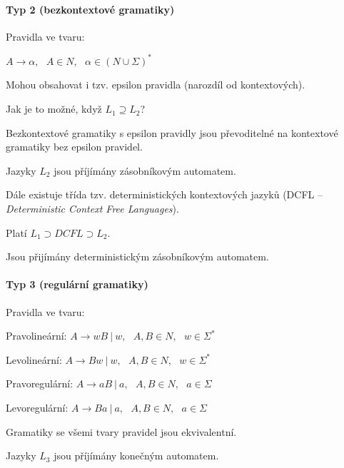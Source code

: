 \paragraph*{Typ 2 (bezkontextové gramatiky)} \begin{compactitem}
    \item Pravidla ve tvaru: \begin{compactitem}
        \item $A \rightarrow \alpha,~~~ A \in N,~~~ \alpha \in (N \cup \Sigma)^*$
        \item Mohou obsahovat i tzv. epsilon pravidla (narozdíl od kontextových).
        \item Jak je to možné, když $L_1 \supseteq L_2$?
        \item Bezkontextové gramatiky s epsilon pravidly jsou převoditelné na kontextové gramatiky bez epsilon pravidel.
    \end{compactitem}

    \item Jazyky $L_2$ jsou příjímány zásobníkovým automatem.

    \item Dále existuje třída tzv. deterministických kontextových jazyků (DCFL -- \textit{Deterministic Context Free Languages}). \begin{compactitem}
        \item Platí $L_1 \supset DCFL \supset L_2$.
        \item Jsou přijímány deterministickým zásobníkovým automatem.
    \end{compactitem}
\end{compactitem}

\paragraph*{Typ 3 (regulární gramatiky)} \begin{compactitem}
    \item Pravidla ve tvaru: \begin{compactitem}
        \item Pravolineární: $A \rightarrow wB~|~w,~~~ A,B \in N,~~~ w \in \Sigma^*$

        \item Levolineární: $A \rightarrow Bw~|~w,~~~ A,B \in N,~~~ w \in \Sigma^*$

        \item Pravoregulární: $A \rightarrow aB~|~a,~~~ A,B \in N,~~~ a \in \Sigma$

        \item Levoregulární: $A \rightarrow Ba~|~a,~~~ A,B \in N,~~~ a \in \Sigma$
    \end{compactitem}

    \item Gramatiky se všemi tvary pravidel jsou ekvivalentní.

    \item Jazyky $L_3$ jsou příjímány konečným automatem.
\end{compactitem}

